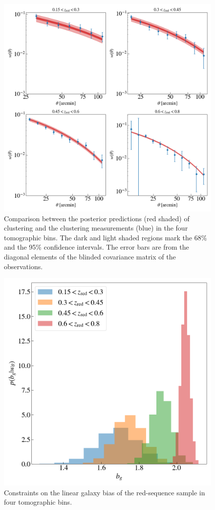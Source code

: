 \documentclass[fleqn,usenatbib,useAMS]{mnras}
\begin{document}
\begin{figure}
\includegraphics[width=\textwidth]{figures_tmp/w_estimate.png}
\caption{\label{fig:xi} Comparison between the posterior predictions (red shaded) of clustering and the clustering measurements (blue) in the four tomographic bins. The dark and light shaded regions mark the 68\% and the 95\% confidence intervals. The error bars are from the diagonal elements of the blinded covariance matrix of the observations.} 
\end{figure}


\begin{figure}
\includegraphics[width=\columnwidth]{figures_tmp/b_estimate.png}
\caption{\label{fig:xi} Constraints on the linear galaxy bias of the red-sequence sample in four tomographic bins.} 
\end{figure}
\end{document}
